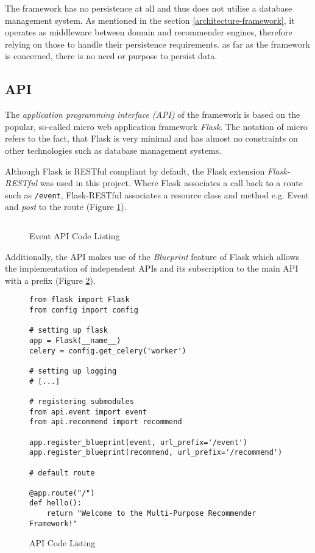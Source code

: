 The framework has no persistence at all and thus does not utilise a database management system. As mentioned in the section \ref{architecture-framework}, it operates as middleware between domain and recommender engines, therefore relying on those to handle their persistence requirements. as far as the framework is concerned, there is no need or purpose to persist data.

\subsection{API}

The \emph{application programming interface (API)} of the framework is based on the popular, so-called micro web application framework \emph{Flask}. The notation of micro refers to the fact, that Flask is very minimal and has almost no constraints on other technologies such as database management systems.

Although Flask is RESTful compliant by default, the Flask extension \emph{Flask-RESTful} was used in this project. Where Flask associates a call back to a route such as \texttt{/event}, Flask-RESTful associates a resource class and method e.g. Event and \emph{post} to the route (Figure \ref{fig:implementation-framework-api-event}).

\begin{figure}[ht]
    \inputminted{py}{./includes/source/framework/api/event.py}
    \caption{Event API Code Listing}
    \label{fig:implementation-framework-api-event}
\end{figure}

Additionally, the API makes use of the \emph{Blueprint} feature of Flask which allows the implementation of independent APIs and its subscription to the main API with a prefix (Figure \ref{fig:implementation-framework-api}).

\begin{figure}[ht!]
    \begin{verbatim}
from flask import Flask
from config import config

# setting up flask
app = Flask(__name__)
celery = config.get_celery('worker')

# setting up logging
# [...]

# registering submodules
from api.event import event
from api.recommend import recommend

app.register_blueprint(event, url_prefix='/event')
app.register_blueprint(recommend, url_prefix='/recommend')

# default route

@app.route("/")
def hello():
    return "Welcome to the Multi-Purpose Recommender Framework!"
    \end{verbatim}
    \caption{API Code Listing}
    \label{fig:implementation-framework-api}
\end{figure}

